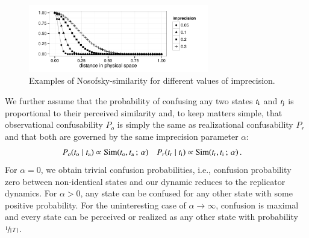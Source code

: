 \documentclass[fleqn,reqno,10pt]{article}
\newcommand{\imprecision}{\ensuremath{\alpha}} %
\newcommand{\similarity}{\ensuremath{\mathrm{Sim}}} %
\begin{document}
\begin{figure}
  \centering

  \includegraphics[width=0.7\textwidth]{plots/NosofskySim.pdf}

  \caption{Examples of Nosofsky-similarity for different values of
    imprecision.}
  \label{fig:NosofskySim}
\end{figure}


We further assume that the probability of confusing any two states $t_{\mathrm{i}}$ and
$t_{\mathrm{j}}$ is proportional to their perceived similarity and, to keep matters simple, that
observational confusability $P_o$ is simply the same as realizational confusability $P_r$ and
that both are governed by the same imprecision parameter $\alpha$:
\begin{align*}
  P_o(\mystate{o} \probbar \mystate{a}) & \propto \similarity(\mystate{o}, \mystate{a} \myts ; \myts
  \imprecision) &   P_r(\mystate{r} \probbar \mystate{i}) & \propto \similarity(\mystate{r}, \mystate{i} \myts ; \myts
  \imprecision) \,.
\end{align*}
For $\imprecision = 0$, we obtain trivial confusion probabilities, i.e., confusion probability
zero between non-identical states and our dynamic reduces to the replicator dynamics. For
$\imprecision > 0$, any state can be confused for any other state with some positive
probability. For the uninteresting case of $\imprecision \rightarrow \infty$, confusion is
maximal and every state can be perceived or realized as any other state with probability
$\nicefrac{1}{\left \lvert \, T \, \right\rvert}$.
\end{document}
